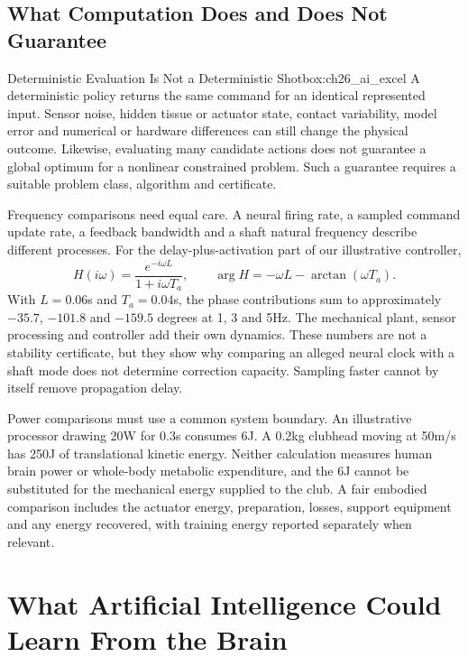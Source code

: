\subsection{What Computation Does and Does Not Guarantee}
\label{subsec:ch26_ai_better}

\begin{principle}{Deterministic Evaluation Is Not a Deterministic Shot}{box:ch26_ai_excel}
A deterministic policy returns the same command for an identical represented input. Sensor noise, hidden tissue or actuator state, contact variability, model error and numerical or hardware differences can still change the physical outcome. Likewise, evaluating many candidate actions does not guarantee a global optimum for a nonlinear constrained problem. Such a guarantee requires a suitable problem class, algorithm and certificate.
\end{principle}

Frequency comparisons need equal care. A neural firing rate, a sampled command update rate, a feedback bandwidth and a shaft natural frequency describe different processes. For the delay-plus-activation part of our illustrative controller,
\[
H(i\omega)=\frac{e^{-i\omega L}}{1+i\omega T_a},\qquad
\arg H=-\omega L-\arctan(\omega T_a).
\]
With $L=0.06$s and $T_a=0.04$s, the phase contributions sum to approximately $-35.7$, $-101.8$ and $-159.5$ degrees at 1, 3 and 5Hz. The mechanical plant, sensor processing and controller add their own dynamics. These numbers are not a stability certificate, but they show why comparing an alleged neural clock with a shaft mode does not determine correction capacity. Sampling faster cannot by itself remove propagation delay.

Power comparisons must use a common system boundary. An illustrative processor drawing 20W for 0.3s consumes 6J. A 0.2kg clubhead moving at 50m/s has 250J of translational kinetic energy. Neither calculation measures human brain power or whole-body metabolic expenditure, and the 6J cannot be substituted for the mechanical energy supplied to the club. A fair embodied comparison includes the actuator energy, preparation, losses, support equipment and any energy recovered, with training energy reported separately when relevant.

\section{What Artificial Intelligence Could Learn From the Brain}
\label{sec:ch26_ai_from_brain}

